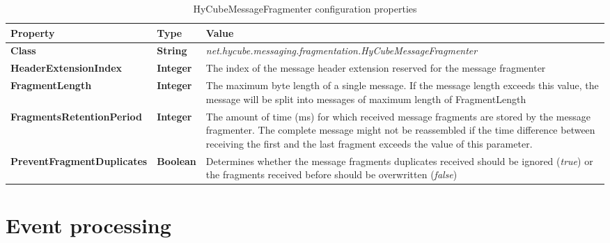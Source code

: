\begin{table}
\scriptsize
\begin{center}
\begin{tabular}{p{5.0cm} p{1.0cm} p{8.5cm}}
	\hline
	\textbf{Property}							& \textbf{Type}					& \textbf{Value}					\\[1mm]
    \hline
	\textbf{Class}								& \textbf{String}				& \textit{net.hycube.messaging.fragmentation.HyCubeMessageFragmenter}							\\[1.5mm]	
	\textbf{HeaderExtensionIndex}				& \textbf{Integer}				& The index of the message header extension reserved for the message fragmenter					\\[1.5mm]	
	\textbf{FragmentLength}						& \textbf{Integer}				& The maximum byte length of a single message. If the message length exceeds this value, the message will be split into messages of maximum length of FragmentLength				\\[1.5mm]	
	\textbf{FragmentsRetentionPeriod}			& \textbf{Integer}				& The amount of time (ms) for which received message fragments are stored by the message fragmenter. The complete message might not be reassembled if the time difference between receiving the first and the last fragment exceeds the value of this parameter.			\\[1.5mm]	
	\textbf{PreventFragmentDuplicates}			& \textbf{Boolean}				& Determines whether the message fragments duplicates received should be ignored (\emph{true}) or the fragments received before should be overwritten (\emph{false})		\\[1.5mm]	
    \hline
\end{tabular}
\end{center}
\caption{HyCubeMessageFragmenter configuration properties}
\label{tab:libHyCubeMessageFragmenter}
\end{table}








\section{Event processing}
\label{sec:libEventProcessing}


